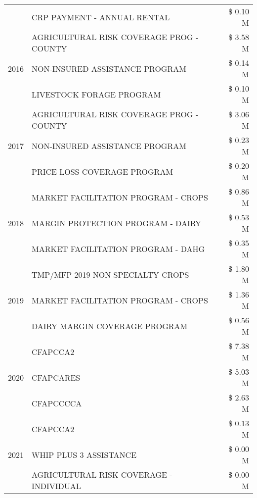 \begin{tabular}{llr}
 & CRP PAYMENT - ANNUAL RENTAL & \$ 0.10 M \\
\cline{1-3}
\multirow[t]{3}{*}{2016} & AGRICULTURAL RISK COVERAGE PROG - COUNTY & \$ 3.58 M \\
 & NON-INSURED ASSISTANCE PROGRAM & \$ 0.14 M \\
 & LIVESTOCK FORAGE PROGRAM & \$ 0.10 M \\
\cline{1-3}
\multirow[t]{3}{*}{2017} & AGRICULTURAL RISK COVERAGE PROG - COUNTY & \$ 3.06 M \\
 & NON-INSURED ASSISTANCE PROGRAM & \$ 0.23 M \\
 & PRICE LOSS COVERAGE PROGRAM & \$ 0.20 M \\
\cline{1-3}
\multirow[t]{3}{*}{2018} & MARKET FACILITATION PROGRAM - CROPS & \$ 0.86 M \\
 & MARGIN PROTECTION PROGRAM - DAIRY & \$ 0.53 M \\
 & MARKET FACILITATION PROGRAM - DAHG & \$ 0.35 M \\
\cline{1-3}
\multirow[t]{3}{*}{2019} & TMP/MFP 2019 NON SPECIALTY CROPS & \$ 1.80 M \\
 & MARKET FACILITATION PROGRAM - CROPS & \$ 1.36 M \\
 & DAIRY MARGIN COVERAGE PROGRAM & \$ 0.56 M \\
\cline{1-3}
\multirow[t]{3}{*}{2020} & CFAPCCA2 & \$ 7.38 M \\
 & CFAPCARES & \$ 5.03 M \\
 & CFAPCCCCA & \$ 2.63 M \\
\cline{1-3}
\multirow[t]{3}{*}{2021} & CFAPCCA2 & \$ 0.13 M \\
 & WHIP PLUS 3 ASSISTANCE & \$ 0.00 M \\
 & AGRICULTURAL RISK COVERAGE - INDIVIDUAL & \$ 0.00 M \\
\cline{1-3}
\bottomrule
\end{tabular}
